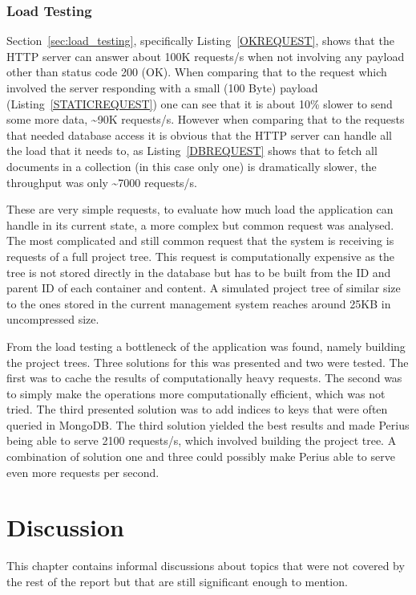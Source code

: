 \documentclass[a4paper,12pt]{article}
\begin{document}
\subsubsection{Load Testing}
Section~\ref{sec:load_testing}, specifically Listing~\ref{OKREQUEST}, shows that the HTTP server can
answer about 100K requests/s when not involving any payload other than status code 200 (OK). When
comparing that to the request which involved the server responding with a small (100 Byte) payload
(Listing~\ref{STATICREQUEST}) one can see that it is about 10\% slower to send some more data,
\textasciitilde90K requests/s. However when comparing that to the requests that needed database
access it is obvious that the HTTP server can handle all the load that it needs to, as
Listing~\ref{DBREQUEST} shows that to fetch all documents in a collection (in this case only one) is
dramatically slower, the throughput was only \textasciitilde7000 requests/s. 

\par These are very simple requests, to evaluate how much load the application can handle in its
current state, a more complex but common request was analysed. The most complicated and still
common request that the system is receiving is requests of a full project tree. This request is
computationally expensive as the tree is not stored directly in the database but has to be built
from the ID and parent ID of each container and content. A simulated project tree of similar size to
the ones stored in the current management system reaches around 25KB in uncompressed size.

\par From the load testing a bottleneck of the application was found, namely building the project
trees. Three solutions for this was presented and two were tested. The first was to cache the
results of computationally heavy requests. The second was to simply make the operations more
computationally efficient, which was not tried. The third presented solution was to add indices to
keys that were often queried in MongoDB. The third solution yielded the best results and made Perius
being able to serve 2100 requests/s, which involved building the project tree. A combination of
solution one and three could possibly make Perius able to serve even more requests per second.

\restoregeometry
\newpage
\section{Discussion}
This chapter contains informal discussions about topics that were not covered by the rest of the
report but that are still significant enough to mention.
\end{document}
